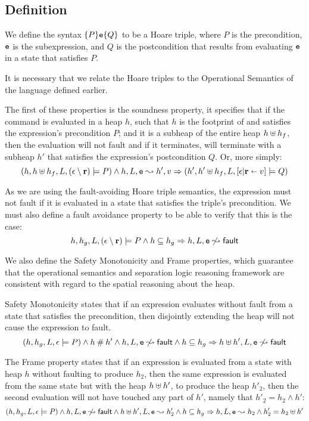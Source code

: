 \documentclass[a4paper,notitlepage]{report}
\begin{document}
\subsection{Definition}
We define the syntax $\{P\}\mathtt{e}\{Q\}$ to be a Hoare triple, where $P$ is the
precondition, $\mathtt{e}$ is the subexpression, and $Q$ is the
postcondition that results from evaluating $\mathtt{e}$ in a state that satisfies $P$.

It is necessary that we relate the Hoare triples to the Operational Semantics of
the language defined earlier.

The first of these properties is the soundness property, it specifies that if
the command  is evaluated in a heap $h$, such that $h$ is the footprint of
and satisfies the expression's precondition $P$; and it is a subheap of the
entire heap $h \uplus h_f$, then the evaluation will not fault and if it
terminates, will terminate with a subheap $h'$ that satisfies the expression's
postcondition $Q$. Or, more simply:
\[ (h, h \uplus h_f, L, (\epsilon\setminus{\ensuremath{\mathrm{\textbf{r}}}}) \models P) \land h, L, \mathtt{e} \leadsto h', v
  \Rightarrow (h', h' \uplus h_f, L, [\epsilon|{\mathrm{\textbf{r}}}\shortleftarrow v] \models Q) \]

As we are using the fault-avoiding Hoare triple semantics, the expression must
not fault if it is evaluated in a state that satisfies the triple's
precondition. We must also define a fault avoidance property to be able to
verify that this is the case:
\[ h, h_g, L, (\epsilon\setminus{\ensuremath{\mathrm{\textbf{r}}}}) \models P \land h\subseteq h_g \Rightarrow h, L, \mathtt{e} \not\leadsto {\ensuremath{\mathsf{fault}}} \]

We also define the Safety Monotonicity and Frame properties, which guarantee
that the operational semantics and separation logic reasoning framework are
consistent with regard to the spatial reasoning about the heap.

Safety Monotonicity states that if an expression evaluates without fault from a
state that satisfies the precondition, then disjointly extending the heap will
not cause the expression to fault.
\[ (h, h_g, L, \epsilon \models P) \land h \mathbin{\#} h' \land h, L, \mathtt{e} \not\leadsto
  {\ensuremath{\mathsf{fault}}} \land h\subseteq h_g \Rightarrow h \uplus h', L, \mathtt{e} \not\leadsto {\ensuremath{\mathsf{fault}}} \]

The Frame property states that if an expression is evaluated from a state with
heap $h$ without faulting to produce $h_2$, then the same expression is
evaluated from the same state but with the heap $h \uplus h'$, to produce the
heap $h'_2$, then the second evaluation will not have touched any part of $h'$,
namely that $h'_2 = h_2 \land h'$:
\[ (h, h_g, L, \epsilon \models P) \land h, L, \mathtt{e} \not\leadsto {\ensuremath{\mathsf{fault}}} \land
  h \uplus h', L, \mathtt{e} \leadsto h_2' \land h\subseteq h_g\Rightarrow h, L, \mathtt{e} \leadsto h_2 \land
  h_2' = h_2 \uplus h' \]
\end{document}
